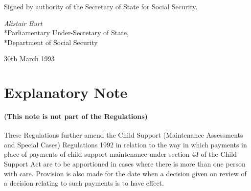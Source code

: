 \documentclass[12pt,a4paper]{article}
\begin{document}
\bigskip

Signed by authority of the Secretary of State for Social Security.

{\raggedleft
\emph{Alistair Burt}\\*Parliamentary Under-Secretary of State,\\*Department of Social Security

}

30th March 1993

\part{Explanatory Note}

\renewcommand\parthead{--- Explanatory Note}

\subsection*{(This note is not part of the Regulations)}

These Regulations further amend the Child Support (Maintenance Assessments and Special Cases) Regulations 1992 in relation to the way in which payments in place of payments of child support maintenance under section 43 of the Child Support Act are to be apportioned in cases where there is more than one person with care. Provision is also made for the date when a decision given on review of a decision relating to such payments is to have effect.
\end{document}
